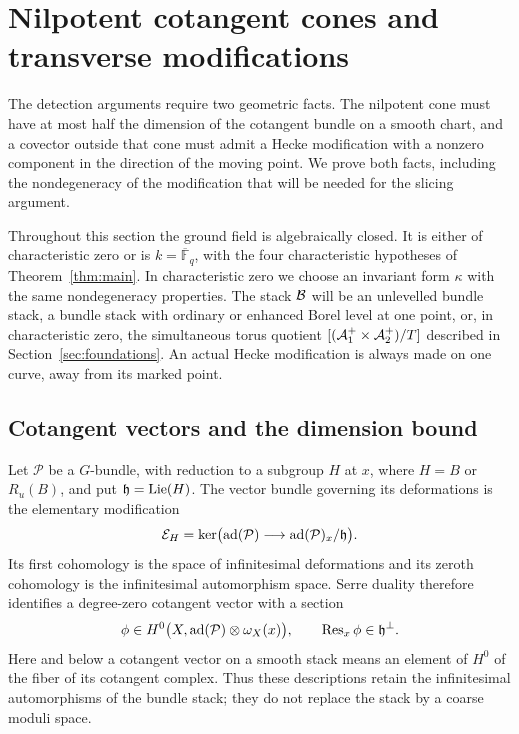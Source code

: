 \section{Nilpotent cotangent cones and transverse modifications}
\label{sec:geometry}

The detection arguments require two geometric facts.  The nilpotent cone
must have at most half the dimension of the cotangent bundle on a smooth
chart, and a covector outside that cone must admit a Hecke modification
with a nonzero component in the direction of the moving point.  We prove
both facts, including the nondegeneracy of the modification that will be
needed for the slicing argument.

Throughout this section the ground field is algebraically closed.  It is
either of characteristic zero or is $k=\overline{\mathbb F}_q$, with the
four characteristic hypotheses of Theorem~\ref{thm:main}.  In characteristic
zero we choose an invariant form $\kappa$ with the same nondegeneracy
properties.  The stack $\mathcal B$ will be an unlevelled bundle stack, a bundle
stack with ordinary or enhanced Borel level at one point, or, in
characteristic zero, the simultaneous torus quotient
$[(\mathcal A_1^+\times\mathcal A_2^+)/T]$ described in Section~\ref{sec:foundations}.
An actual Hecke modification is always made on one curve, away from its
marked point.

\subsection{Cotangent vectors and the dimension bound}

Let $\mathcal P$ be a $G$-bundle, with reduction to a subgroup $H$ at $x$,
where $H=B$ or $R_u(B)$, and put $\mathfrak h=\operatorname{Lie}(H)$.
The vector bundle governing its deformations is
the elementary modification
\[
 \mathcal E_H
 =\ker\bigl(\operatorname{ad}(\mathcal P)\longrightarrow
                  \operatorname{ad}(\mathcal P)_x/\mathfrak h\bigr).
\]
Its first cohomology is the space of infinitesimal deformations and its
zeroth cohomology is the infinitesimal automorphism space.  Serre duality
therefore identifies a degree-zero cotangent vector with a section
\begin{equation}\label{eq:geometry-cotangent}
 \phi\in H^0\bigl(X,\operatorname{ad}(\mathcal P)\otimes\omega_X(x)\bigr),
 \qquad \operatorname{Res}_x\phi\in\mathfrak h^\perp.
\end{equation}
Here and below a cotangent vector on a smooth stack means an element of
$H^0$ of the fiber of its cotangent complex.  Thus these descriptions
retain the infinitesimal automorphisms of the bundle stack; they do not
replace the stack by a coarse moduli space.

